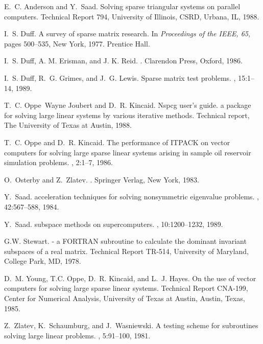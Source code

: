 \newpage
\begin{thebibliography}{10}

E.~C. Anderson and Y.~Saad.
\newblock Solving sparse triangular systems on parallel computers.
\newblock Technical Report 794, University of Illinois, CSRD, Urbana, IL, 1988.

I.~S. Duff.
\newblock A survey of sparse matrix research.
\newblock In {\em Proceedings of the IEEE, 65}, pages 500--535, New York, 1977.
  Prentice Hall.

I.~S. Duff, {A. M. Erisman}, and {J. K. Reid}.
.
\newblock Clarendon Press, Oxford, 1986.

I.~S. Duff, R.~G. Grimes, and J.~G. Lewis.
\newblock Sparse matrix test problems.
, 15:1--14, 1989.

T.~C. Oppe~Wayne Joubert and D.~R. Kincaid.
\newblock Nspcg user's guide. a package for solving large linear systems by
  various iterative methods.
\newblock Technical report, The University of Texas at Austin, 1988.

T.~C. Oppe and D.~R. Kincaid.
\newblock The performance of {ITPACK} on vector computers for solving large
  sparse linear systems arising in sample oil reservoir simulation problems.
, 2:1--7, 1986.

O.~Osterby and Z.~Zlatev.
.
\newblock Springer Verlag, New York, 1983.

Y.~Saad.
 acceleration techniques for solving nonsymmetric
  eigenvalue problems.
, 42:567--588, 1984.

Y.~Saad.
 subspace methods on supercomputers.
, 10:1200--1232, 1989.

G.W. Stewart.
 - a FORTRAN subroutine to calculate the dominant invariant
  subspaces of a real matrix.
\newblock Technical Report TR-514, University of Maryland, College Park, MD,
  1978.

D.~M. Young, T.C. Oppe, D.~R. Kincaid, and L.~J. Hayes.
\newblock On the use of vector computers for solving large sparse linear
  systems.
\newblock Technical Report CNA-199, Center for Numerical Analysis, University
  of Texas at Austin, Austin, Texas, 1985.

Z.~Zlatev, K.~Schaumburg, and J.~Wasniewski.
\newblock A testing scheme for subroutines solving large linear problems.
, 5:91--100, 1981.

\end{thebibliography}

